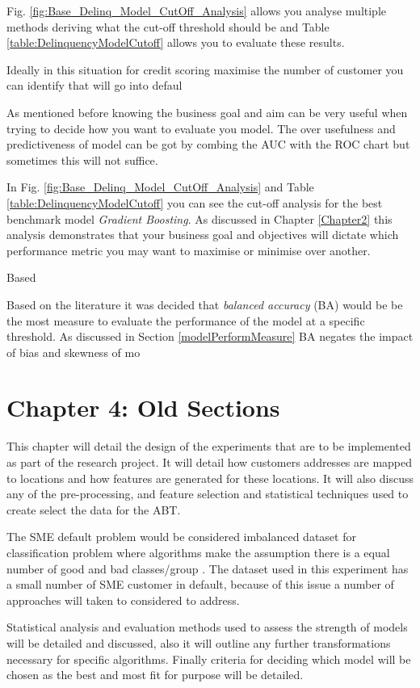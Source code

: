 Fig. \ref{fig:Base_Delinq_Model_CutOff_Analysis} allows you analyse multiple methods deriving what the cut-off threshold should be and Table \ref{table:DelinquencyModelCutoff} allows you to evaluate these results.

Ideally in this situation for credit scoring maximise the number of customer you can identify that will go into defaul 

As mentioned before knowing the business goal and aim can be very useful when trying to decide how you want to evaluate you model. The over usefulness and predictiveness of model can be got by combing the AUC with the ROC chart but sometimes this will not suffice. 

In Fig. \ref{fig:Base_Delinq_Model_CutOff_Analysis} and Table \ref{table:DelinquencyModelCutoff} you can see the cut-off analysis for the best benchmark model \textit{Gradient Boosting}. As discussed in Chapter \ref{Chapter2} this analysis demonstrates that your business goal and objectives will dictate which performance metric you may want to maximise or minimise over another. 

Based 

Based on the literature it was decided that \textit{balanced accuracy} (BA) would be be the most measure to evaluate the performance of the model at a specific threshold. As discussed in Section \ref{modelPerformMeasure} BA negates the impact of bias and skewness of mo

\section{Chapter 4: Old Sections}
This chapter will detail the design of the experiments that are to be implemented as part of the research project. It will detail how customers addresses are mapped to locations and how features are generated for these locations. It will also discuss any of the pre-processing, and feature selection and statistical techniques used to create select the data for the ABT.

The SME default problem would be considered imbalanced dataset for classification problem where algorithms make the assumption there is a equal number of good and bad classes/group \citep{japkowicz_class_2000}. The dataset used in this experiment has a small number of SME customer in default, because of this issue a number of approaches will taken to considered to address.

Statistical analysis and evaluation methods used to assess the strength of models will be detailed and discussed, also it will outline any further transformations necessary for specific algorithms. Finally criteria for deciding which model will be chosen as the best and most fit for purpose will be detailed.


